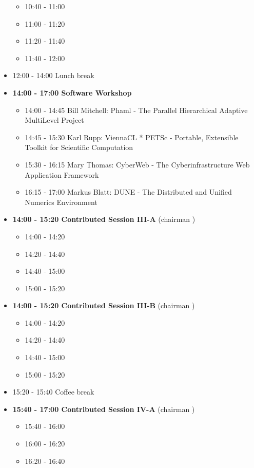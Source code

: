 \documentclass[10pt, A4]{article}%
\begin{document}
\begin{itemize}
  \begin{itemize}
    \item 10:40 - 11:00
    \item 11:00 - 11:20 
    \item 11:20 - 11:40 
    \item 11:40 - 12:00 
  \end{itemize}
  \item 12:00 - 14:00 Lunch break
  \item {\bf 14:00 - 17:00 Software Workshop}
  \begin{itemize}
    \item 14:00 - 14:45 Bill Mitchell: Phaml - The Parallel Hierarchical Adaptive MultiLevel Project
    \item 14:45 - 15:30 Karl Rupp: ViennaCL * PETSc - Portable, Extensible Toolkit for
Scientific Computation
    \item 15:30 - 16:15 Mary Thomas: CyberWeb - The Cyberinfrastructure Web Application Framework
    \item 16:15 - 17:00 Markus Blatt: DUNE - The Distributed and Unified Numerics Environment
  \end{itemize}
  \item {\bf 14:00 - 15:20 Contributed Session III-A} (chairman ) 
  \begin{itemize}
    \item 14:00 - 14:20 
    \item 14:20 - 14:40 
    \item 14:40 - 15:00
    \item 15:00 - 15:20  
  \end{itemize}
  \item {\bf 14:00 - 15:20 Contributed Session III-B} (chairman ) 
  \begin{itemize}
    \item 14:00 - 14:20 
    \item 14:20 - 14:40 
    \item 14:40 - 15:00
    \item 15:00 - 15:20  
  \end{itemize}
  \item 15:20 - 15:40 Coffee break
  \item {\bf 15:40 - 17:00 Contributed Session IV-A} (chairman ) 
  \begin{itemize}
    \item 15:40 - 16:00
    \item 16:00 - 16:20 
    \item 16:20 - 16:40 

\end{itemize}
\end{itemize}
\end{document}
